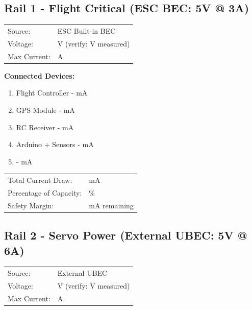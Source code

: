 \documentclass[10pt,letterpaper]{article}
\begin{document}
\subsection*{Rail 1 - Flight Critical (ESC BEC: 5V @ 3A)}
\begin{tabularx}{\textwidth}{lX}
Source: & ESC Built-in BEC \\
Voltage: & \underline{\hspace{2cm}} V (verify: \underline{\hspace{2cm}} V measured) \\
Max Current: & \underline{\hspace{2cm}} A \\
\end{tabularx}

\textbf{Connected Devices:}
\begin{enumerate}[nosep]
\item Flight Controller - \underline{\hspace{3cm}} mA
\item GPS Module - \underline{\hspace{3cm}} mA
\item RC Receiver - \underline{\hspace{3cm}} mA
\item Arduino + Sensors - \underline{\hspace{3cm}} mA
\item \underline{\hspace{4cm}} - \underline{\hspace{3cm}} mA
\end{enumerate}

\begin{tabularx}{\textwidth}{lX}
Total Current Draw: & \underline{\hspace{3cm}} mA \\
Percentage of Capacity: & \underline{\hspace{3cm}} \% \\
Safety Margin: & \underline{\hspace{3cm}} mA remaining \\
\end{tabularx}

\subsection*{Rail 2 - Servo Power (External UBEC: 5V @ 6A)}
\begin{tabularx}{\textwidth}{lX}
Source: & External UBEC \\
Voltage: & \underline{\hspace{2cm}} V (verify: \underline{\hspace{2cm}} V measured) \\
Max Current: & \underline{\hspace{2cm}} A \\
\end{tabularx}
\end{document}
